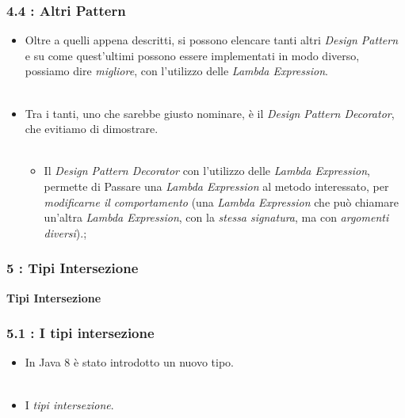 \documentclass{beamer}
\begin{document}

\begin{frame}
	\frametitle{\textbf{4.4 : Altri Pattern}}
	\begin{itemize}
		\item
			Oltre a quelli appena descritti, si possono elencare tanti altri \textit{Design Pattern} e su come quest'ultimi possono essere implementati in modo diverso, possiamo dire \textit{migliore}, con l'utilizzo delle \textit{Lambda Expression}.\\\
		\item
			Tra i tanti, uno che sarebbe giusto nominare, è il \textit{Design Pattern Decorator}, che evitiamo di dimostrare.\\\
			\begin{itemize}
				\item
					Il \textit{Design Pattern Decorator} con l'utilizzo delle \textit{Lambda Expression}, permette di Passare una \textit{Lambda Expression} al metodo interessato, per \textit{modificarne il comportamento} (una \textit{Lambda Expression} che può chiamare un'altra \textit{Lambda Expression}, con la \textit{stessa signatura}, ma con \textit{argomenti diversi}).;
			\end{itemize}
	\end{itemize}
\end{frame}


\begin{frame}
	\frametitle{\textbf{5 : Tipi Intersezione}}
	\begin{center}
		\textbf{\Huge Tipi Intersezione}
	\end{center}
\end{frame}


\begin{frame}
	\frametitle{\textbf{5.1 : I tipi intersezione}}
	\begin{itemize}
		\item
			In Java 8 è stato introdotto un nuovo tipo.\\\
		\item
			I \textit{tipi intersezione}.
	\end{itemize}
\end{frame}
\end{document}
